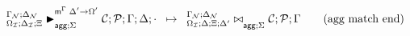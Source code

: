 \[
\trans{
   \matstatea{\deltan}{\lstack{C};
      \lstack{P}}{\Gamma}{\Delta}{\cdot}{\Delta' \rightarrow
         \Omega'}{\Sigma}
}
{
   \fixstatea{\Delta}{\Xi; \Delta'}{\lstack{C}; \lstack{P}}{\Gamma}{\Sigma}
} \tag{agg match end}
\]

